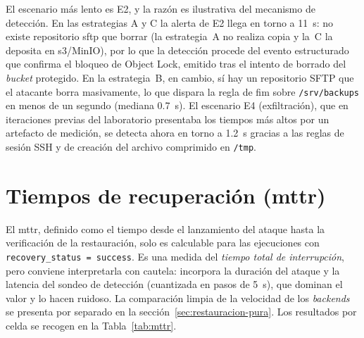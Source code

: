 \documentclass[../main.tex]{subfiles}
\begin{document}
\label{sec:tdetect-e4}
El escenario más lento es E2, y la razón es ilustrativa del mecanismo de detección.
En las estrategias A y C la alerta de E2 llega en torno a 11~s: no existe repositorio
\gls{sftp} que borrar (la estrategia~A no realiza copia y la~C la deposita en
\gls{s3}/MinIO), por lo que la detección procede del evento estructurado que confirma
el bloqueo de Object Lock, emitido tras el intento de borrado del \emph{bucket}
protegido. En la estrategia~B, en cambio, sí hay un repositorio SFTP que el atacante
borra masivamente, lo que dispara la regla de \gls{fim} sobre \texttt{/srv/backups}
en menos de un segundo (mediana 0.7~s). El escenario E4 (exfiltración), que en
iteraciones previas del laboratorio presentaba los tiempos más altos por un artefacto
de medición, se detecta ahora en torno a 1.2~s gracias a las reglas de sesión SSH y
de creación del archivo comprimido en \texttt{/tmp}.

\section{Tiempos de recuperación (\texorpdfstring{\acrshort{mttr}}{MTTR})}

El \gls{mttr}, definido como el tiempo desde el lanzamiento del ataque hasta la
verificación de la restauración, solo es calculable para las ejecuciones con
\texttt{recovery\_status = success}. Es una medida del \emph{tiempo total de
interrupción}, pero conviene interpretarla con cautela: incorpora la duración del
ataque y la latencia del sondeo de detección (cuantizada en pasos de 5~s), que
dominan el valor y lo hacen ruidoso. La comparación limpia de la velocidad de los
\emph{backends} se presenta por separado en la sección~\ref{sec:restauracion-pura}.
Los resultados por celda se recogen en la Tabla~\ref{tab:mttr}.
\end{document}
